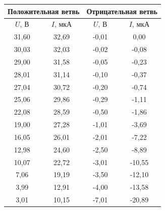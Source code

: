 \documentclass[a4paper,12pt]{article} %
\begin{document}
\begin{table}[h!]
	\centering
	\begin{tabular}{|cc|cc|}
		\hline
		\multicolumn{2}{|c|}{Положительная ветвь}                           & \multicolumn{2}{c|}{Отрицательная ветвь} \\ \hline
		\multicolumn{1}{|c|}{$U$, В}                & $I$, мкА              & \multicolumn{1}{c|}{$U$, В}  & $I$, мкА  \\ \hline
		\multicolumn{1}{|c|}{31,60}                 & 32,69                 & \multicolumn{1}{c|}{-0,01}   & 0,00      \\ \hline
		\multicolumn{1}{|c|}{30,03}                 & 32,03                 & \multicolumn{1}{c|}{-0,02}   & -0,08     \\ \hline
		\multicolumn{1}{|c|}{29,00}                 & 31,58                 & \multicolumn{1}{c|}{-0,05}   & -0,23     \\ \hline
		\multicolumn{1}{|c|}{28,01}                 & 31,14                 & \multicolumn{1}{c|}{-0,10}   & -0,37     \\ \hline
		\multicolumn{1}{|c|}{27,04}                 & 30,72                 & \multicolumn{1}{c|}{-0,20}   & -0,74     \\ \hline
		\multicolumn{1}{|c|}{25,06}                 & 29,86                 & \multicolumn{1}{c|}{-0,29}   & -1,11     \\ \hline
		\multicolumn{1}{|c|}{22,08}                 & 28,59                 & \multicolumn{1}{c|}{-0,50}   & -1,86     \\ \hline
		\multicolumn{1}{|c|}{19,00}                 & 27,28                 & \multicolumn{1}{c|}{-1,01}   & -3,69     \\ \hline
		\multicolumn{1}{|c|}{16,05}                 & 26,01                 & \multicolumn{1}{c|}{-2,01}   & -7,22     \\ \hline
		\multicolumn{1}{|c|}{12,98}                 & 24,60                 & \multicolumn{1}{c|}{-2,50}   & -8,89     \\ \hline
		\multicolumn{1}{|c|}{10,07}                 & 22,72                 & \multicolumn{1}{c|}{-3,01}   & -10,55    \\ \hline
		\multicolumn{1}{|c|}{7,06}                  & 19,19                 & \multicolumn{1}{c|}{-3,50}   & -12,10    \\ \hline
		\multicolumn{1}{|c|}{3,99}                  & 12,91                 & \multicolumn{1}{c|}{-4,00}   & -13,58    \\ \hline
		\multicolumn{1}{|c|}{3,01}                  & 10,15                 & \multicolumn{1}{c|}{-7,01}   & -20,89    \\ \hline

\end{tabular}
\end{table}
\end{document}

